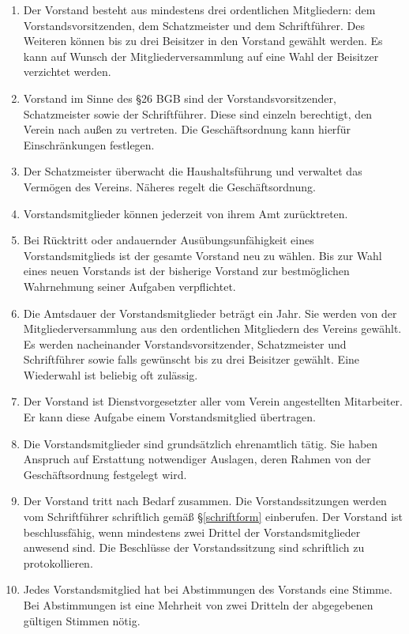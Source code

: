 \documentclass[fontsize=12pt,paper=a4,pagesize,headings=small]{scrartcl}
\begin{document}
\begin{enumerate}
	\item Der Vorstand besteht aus mindestens drei ordentlichen
		Mitgliedern: dem Vorstandsvorsitzenden, dem Schatzmeister und dem
		Schriftführer. Des Weiteren können bis zu drei Beisitzer in den
		Vorstand gewählt werden. Es kann auf Wunsch der
		Mitgliederversammlung auf eine Wahl der Beisitzer verzichtet werden.

	\item Vorstand im Sinne des §26 BGB sind der Vorstandsvorsitzender,
		Schatzmeister sowie der Schriftführer. Diese sind einzeln
		berechtigt, den Verein nach außen zu vertreten. Die Geschäftsordnung
		kann hierfür Einschränkungen festlegen.

	\item Der Schatzmeister überwacht die Haushaltsführung und verwaltet
		das Vermögen des Vereins. Näheres regelt die Geschäftsordnung.

	\item Vorstandsmitglieder können jederzeit von ihrem Amt zurücktreten.

	\item Bei Rücktritt oder andauernder Ausübungsunfähigkeit eines
		Vorstandsmitglieds ist der gesamte Vorstand neu zu wählen. Bis zur
		Wahl eines neuen Vorstands ist der bisherige Vorstand zur
		bestmöglichen Wahrnehmung seiner Aufgaben verpflichtet.

	\item Die Amtsdauer der Vorstandsmitglieder beträgt ein Jahr. Sie werden
		von der Mitgliederversammlung aus den ordentlichen Mitgliedern des
		Vereins gewählt. Es werden nacheinander Vorstandsvorsitzender,
		Schatzmeister und Schriftführer sowie falls gewünscht bis zu drei
		Beisitzer gewählt. Eine Wiederwahl ist beliebig oft zulässig.

	\item Der Vorstand ist Dienstvorgesetzter aller vom Verein angestellten
		Mitarbeiter. Er kann diese Aufgabe einem Vorstandsmitglied übertragen.

	\item Die Vorstandsmitglieder sind grundsätzlich ehrenamtlich tätig.
		Sie haben Anspruch auf Erstattung notwendiger Auslagen, deren Rahmen
		von der Geschäftsordnung festgelegt wird.

	\item Der Vorstand tritt nach Bedarf zusammen. Die Vorstandssitzungen
		werden vom Schriftführer schriftlich gemäß §\ref{schriftform} einberufen. Der Vorstand
		ist beschlussfähig, wenn mindestens zwei Drittel der Vorstandsmitglieder
		anwesend sind. Die Beschlüsse der Vorstandssitzung sind schriftlich zu
		protokollieren.

	\item Jedes Vorstandsmitglied hat bei Abstimmungen des Vorstands eine
		Stimme. Bei Abstimmungen ist eine Mehrheit von zwei Dritteln der
		abgegebenen gültigen Stimmen nötig.
\end{enumerate}
\end{document}
